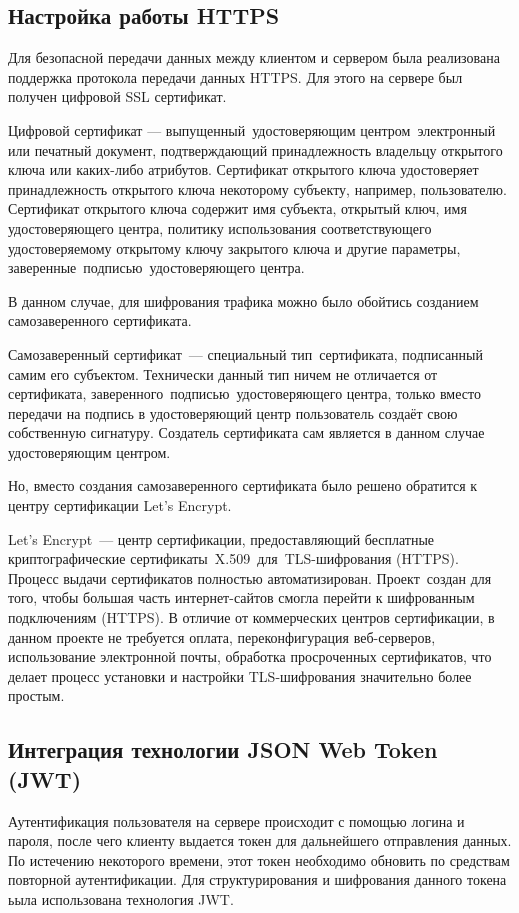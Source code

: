 \clearpage
\subsection{Настройка работы HTTPS}
Для безопасной передачи данных между клиентом и сервером была реализована
поддержка протокола передачи данных HTTPS. Для этого на сервере был получен цифровой SSL сертификат.
\begin{definition}
   Цифровой сертификат --- выпущенный удостоверяющим центром электронный или печатный документ,
   подтверждающий принадлежность владельцу открытого ключа или каких-либо атрибутов.
   Сертификат открытого ключа удостоверяет принадлежность открытого ключа некоторому субъекту, например, пользователю.
   Сертификат открытого ключа содержит имя субъекта, открытый ключ, имя удостоверяющего центра,
   политику использования соответствующего удостоверяемому открытому ключу закрытого ключа и другие параметры, заверенные подписью удостоверяющего центра.
\end{definition}

В данном случае, для шифрования трафика можно было обойтись созданием самозаверенного сертификата.
\begin{definition}
   Самозаверенный сертификат --- специальный тип сертификата, подписанный самим его субъектом. Технически данный тип ничем не отличается от сертификата,
   заверенного подписью удостоверяющего центра, только вместо передачи на подпись в удостоверяющий центр пользователь создаёт свою собственную сигнатуру.
   Создатель сертификата сам является в данном случае удостоверяющим центром.
\end{definition}

Но, вместо создания самозаверенного сертификата было решено обратится к центру сертификации Let’s Encrypt.
\begin{definition}
   Let’s Encrypt --- центр сертификации, предоставляющий бесплатные криптографические сертификаты X.509 для TLS-шифрования (HTTPS).
   Процесс выдачи сертификатов полностью автоматизирован. Проект создан для того,
   чтобы большая часть интернет-сайтов смогла перейти к шифрованным подключениям (HTTPS). В отличие от коммерческих центров сертификации,
   в данном проекте не требуется оплата, переконфигурация веб-серверов, использование электронной почты,
   обработка просроченных сертификатов, что делает процесс установки и настройки TLS-шифрования значительно более простым.
\end{definition}


\clearpage
\subsection{Интеграция технологии JSON Web Token (JWT)}
Аутентификация пользователя на сервере происходит с помощью логина и пароля, после чего клиенту выдается токен для дальнейшего отправления данных.
По истечению некоторого времени, этот токен необходимо обновить по средствам повторной аутентификации.
Для структурирования и шифрования данного токена ьыла использована технология JWT.

